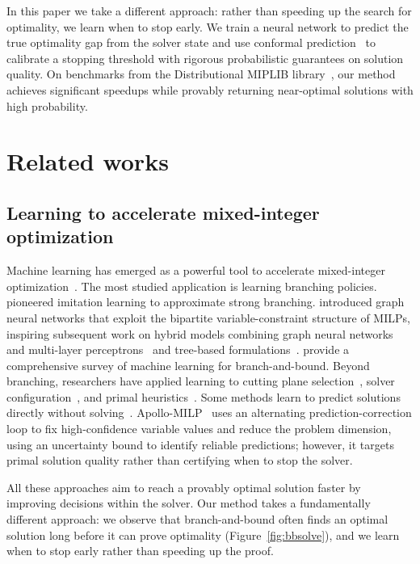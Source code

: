 \documentclass[12pt]{article}
\renewcommand{\cite}[1]{\citep{#1}}
\theoremstyle{definition}
\theoremstyle{remark}
\newcommand{\change}[1]{#1}
\newcommand{\change}[1]{#1}
\theoremstyle{plain}
\theoremstyle{definition}
\theoremstyle{remark}
\begin{document}
In this paper we take a different approach: rather than speeding up the search for optimality, we learn when to stop early.
We train a neural network to predict the true optimality gap from the solver state and use conformal prediction~\cite{Angelopoulos2021AGI} to calibrate a stopping threshold with rigorous probabilistic guarantees on solution quality.
On benchmarks from the Distributional MIPLIB library~\cite{Huang2024DistributionalMA}, our method achieves significant speedups while provably returning near-optimal solutions with high probability.

\section{Related works}

\subsection{Learning to accelerate mixed-integer optimization}
Machine learning has emerged as a powerful tool to accelerate mixed-integer optimization~\cite{Bengio2021MachineLF, Zhang2022ASF}.
The most studied application is learning branching policies.
\citet{Khalil2016LearningTB} pioneered imitation learning to approximate strong branching.
\citet{Gasse2019ExactCO} introduced graph neural networks that exploit the bipartite variable-constraint structure of MILPs, inspiring subsequent work on hybrid models combining graph neural networks and multi-layer perceptrons~\cite{Gupta2020HybridMF} and tree-based formulations~\cite{Scavuzzo2022LearningTB}.
\citet{Scavuzzo2024MLaugmentedBB} provide a comprehensive survey of machine learning for branch-and-bound.
Beyond branching, researchers have applied learning to cutting plane selection~\cite{Wang2023LearningCS, Huang2021LearningTS, Dragotto2023DifferentiableCL}, solver configuration~\change{\cite{Patel2023ProgressivelySA, Gao2024NeuralSS, Liu2024L2PMIP}}, and primal heuristics~\change{\cite{Shen2021LearningPH, Nair2020SolvingMI, Angioni2025NeuralCO, Han2023GNNPredict}}.
Some methods learn to predict solutions directly without solving~\cite{Sun2023DIFUSCOGD}.
\change{Apollo-MILP~\cite{Liu2025ApolloMILP} uses an alternating prediction-correction loop to fix high-confidence variable values and reduce the problem dimension, using an uncertainty bound to identify reliable predictions; however, it targets primal solution quality rather than certifying when to stop the solver.}

All these approaches aim to reach a provably optimal solution faster by improving decisions within the solver.
Our method takes a fundamentally different approach: we observe that branch-and-bound often finds an optimal solution long before it can prove optimality (Figure~\ref{fig:bbsolve}), and we learn when to stop early rather than speeding up the proof.
\end{document}
